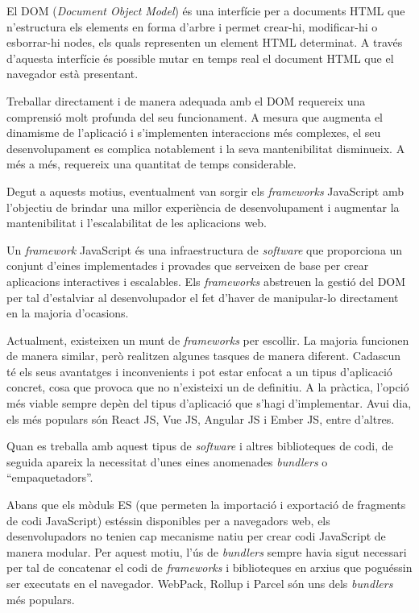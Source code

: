 \documentclass[a4paper,12pt]{ThesisStyle}
\begin{document}
El DOM (\textit{Document Object Model}) és una interfície per a documents HTML que n'estructura els elements en forma d'arbre i permet crear-hi, modificar-hi o esborrar-hi nodes, els quals representen un element HTML determinat. A través d'aquesta interfície és possible mutar en temps real el document HTML que el navegador està presentant.

Treballar directament i de manera adequada amb el DOM requereix una comprensió molt profunda del seu funcionament. A mesura que augmenta el dinamisme de l'aplicació i s'implementen interaccions més complexes, el seu desenvolupament es complica notablement i la seva mantenibilitat disminueix. A més a més, requereix una quantitat de temps considerable.

Degut a aquests motius, eventualment van sorgir els \textit{frameworks} JavaScript amb l'objectiu de brindar una millor experiència de desenvolupament i augmentar la mantenibilitat i l'escalabilitat de les aplicacions web.

Un \textit{framework} JavaScript és una infraestructura de \textit{software} que proporciona un conjunt d'eines implementades i provades que serveixen de base per crear aplicacions interactives i escalables. Els \textit{frameworks} abstreuen la gestió del DOM per tal d'estalviar al desenvolupador el fet d'haver de manipular-lo directament en la majoria d'ocasions.

Actualment, existeixen un munt de \textit{frameworks} per escollir. La majoria funcionen de manera similar, però realitzen algunes tasques de manera diferent. Cadascun té els seus avantatges i inconvenients i pot estar enfocat a un tipus d'aplicació concret, cosa que provoca que no n'existeixi un de definitiu. A la pràctica, l'opció més viable sempre depèn del tipus d'aplicació que s'hagi d'implementar. Avui dia, els més populars són React JS, Vue JS, Angular JS i Ember JS, entre d'altres.

Quan es treballa amb aquest tipus de \textit{software} i altres biblioteques de codi, de seguida apareix la necessitat d'unes eines anomenades \textit{bundlers} o ``empaquetadors''.

Abans que els mòduls ES (que permeten la importació i exportació de fragments de codi JavaScript) estéssin disponibles per a navegadors web, els desenvolupadors no tenien cap mecanisme natiu per crear codi JavaScript de manera modular. Per aquest motiu, l'ús de \textit{bundlers} sempre havia sigut necessari per tal de concatenar el codi de \textit{frameworks} i biblioteques en arxius que poguéssin ser executats en el navegador. WebPack, Rollup i Parcel són uns dels \textit{bundlers} més populars.
\end{document}
